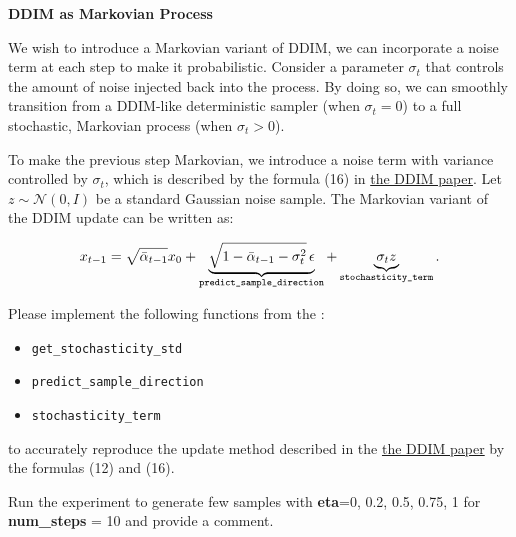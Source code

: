  \textbf{DDIM as Markovian Process}

We wish to introduce a Markovian variant of DDIM, we can incorporate a noise term at each step to make it probabilistic. 
Consider a parameter $\sigma_t$ that controls the amount of noise injected back into the process. By doing so, we can smoothly transition 
from a DDIM-like deterministic sampler (when $\sigma_t=0$) to a full stochastic, Markovian process (when $\sigma_t>0$).


To make the previous step Markovian, we introduce a noise term with variance controlled by $\sigma_t$, which is described by the formula (16) 
in \href{https://arxiv.org/pdf/2010.02502}{the DDIM paper}. Let $z \sim \mathcal{N}(0,I)$ be a standard Gaussian noise sample. 
The Markovian variant of the DDIM update can be written as:

\[
x_{t-1} =
\sqrt{\bar{\alpha}_{t-1}} x_0
+ 
\underbrace{\sqrt{1 - \bar{\alpha}_{t-1} - \sigma_t^2}\,\epsilon}_{\text{\texttt{predict\_sample\_direction}}} 
+ 
\underbrace{\sigma_t z}_{\text{\texttt{stochasticity\_term}}}.
\]

Please implement the following functions from the :
\begin{itemize}
    \item \texttt{get\_stochasticity\_std}
    \item \texttt{predict\_sample\_direction}
    \item \texttt{stochasticity\_term}
\end{itemize}

to accurately reproduce the update method described in the \href{https://arxiv.org/pdf/2010.02502}{the DDIM paper} by the formulas (12) and (16).

Run the experiment to generate few samples with \textbf{eta}=0, 0.2, 0.5, 0.75, 1 for \textbf{num\_steps} = 10 and provide a comment.